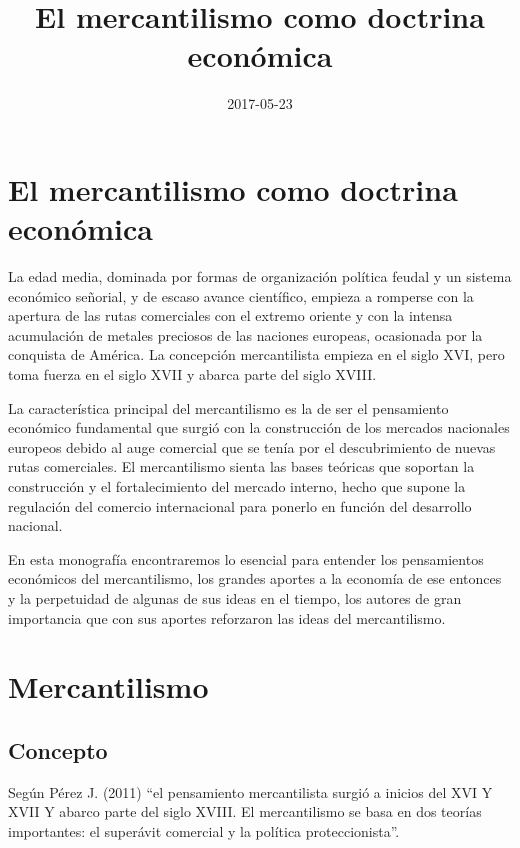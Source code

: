 \documentclass[
  stu,
  floatsintext,
  longtable,
  a4paper,
  nolmodern,
  notxfonts,
  notimes,
  12pt,
  colorlinks=true,linkcolor=blue,citecolor=blue,urlcolor=blue]{apa7}
\title{El mercantilismo como doctrina económica}
\date{2017-05-23}
\begin{document}
\maketitle


\hypertarget{toc}{}
\tableofcontents
\newpage
\section[Introduction]{El mercantilismo como doctrina económica}

\setcounter{secnumdepth}{3}

\setlength\LTleft{0pt}




La edad media, dominada por formas de organización política feudal y un
sistema económico señorial, y de escaso avance científico, empieza a
romperse con la apertura de las rutas comerciales con el extremo oriente
y con la intensa acumulación de metales preciosos de las naciones
europeas, ocasionada por la conquista de América. La concepción
mercantilista empieza en el siglo XVI, pero toma fuerza en el siglo XVII
y abarca parte del siglo XVIII.

La característica principal del mercantilismo es la de ser el
pensamiento económico fundamental que surgió con la construcción de los
mercados nacionales europeos debido al auge comercial que se tenía por
el descubrimiento de nuevas rutas comerciales. El mercantilismo sienta
las bases teóricas que soportan la construcción y el fortalecimiento del
mercado interno, hecho que supone la regulación del comercio
internacional para ponerlo en función del desarrollo nacional.

En esta monografía encontraremos lo esencial para entender los
pensamientos económicos del mercantilismo, los grandes aportes a la
economía de ese entonces y la perpetuidad de algunas de sus ideas en el
tiempo, los autores de gran importancia que con sus aportes reforzaron
las ideas del mercantilismo.

\section{Mercantilismo}\label{mercantilismo}

\subsection{Concepto}\label{concepto}

Según Pérez J. (2011) ``el pensamiento mercantilista surgió a inicios
del XVI Y XVII Y abarco parte del siglo XVIII. El mercantilismo se basa
en dos teorías importantes: el superávit comercial y la política
proteccionista''.
\end{document}
